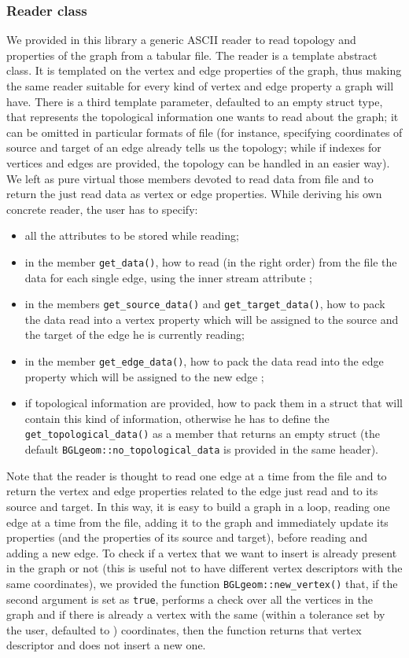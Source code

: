\documentclass[10pt]{article} %
\begin{document}
	\subsubsection{Reader class}		
	We provided in this library a generic ASCII reader to read topology and properties of the graph from a tabular file. The reader is a template abstract class. It is templated on the vertex and edge properties of the graph, thus making the same reader suitable for every kind of vertex and edge property a graph will have. There is a third template parameter, defaulted to an empty struct type, that represents the topological information one wants to read about the graph; it can be omitted in particular formats of file (for instance, specifying coordinates of source and target of an edge already tells us the topology; while if indexes for vertices and edges are provided, the topology can be handled in an easier way). \newline
	We left as pure virtual those members devoted to read data from file and to return the just read data as vertex or edge properties. While deriving his own concrete reader, the user has to specify:
	\begin{itemize}
		\item all the attributes to be stored while reading;
		\item in the member \texttt{get\_data()}, how to read (in the right order) from the file the data for each single edge, using the inner stream attribute ;
		\item in the members \texttt{get\_source\_data()} and \texttt{get\_target\_data()}, how to pack the data read into a vertex property which will be assigned to the source and the target of the edge he is currently reading;
		\item in the member \texttt{get\_edge\_data()}, how to pack the data read into the edge property which will be assigned to the new edge ;
		\item if topological information are provided, how to pack them in a struct that will contain this kind of information, otherwise he has to define the \texttt{get\_topological\_data()} as a member that returns an empty struct (the default \texttt{BGLgeom::no\_topological\_data} is provided in the same header).
	\end{itemize}
	Note that the reader is thought to read one edge at a time from the file and to return the vertex and edge properties related to the edge just read and to its source and target. In this way, it is easy to build a graph in a loop, reading one edge at a time from the file, adding it to the graph and immediately update its properties (and the properties of its source and target), before reading and adding a new edge. To check if a vertex that we want to insert is already present in the graph or not (this is useful not to have different vertex descriptors with the same coordinates), we provided the function \texttt{BGLgeom::new\_vertex()} that, if the second argument is set as \texttt{true}, performs a check over all the vertices in the graph and if there is already a vertex with the same (within a tolerance set by the user, defaulted to ) coordinates, then the function returns that vertex descriptor and does not insert a new one. \newline
\end{document}
